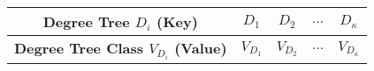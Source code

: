 \begin{tabular}{c || cccc}
	\textbf{Degree Tree \(D_i\) (Key)} & \(D_1\) & \(D_2\) & \(\dots\) & \(D_{\kappa}\) \\
	\hline
	\textbf{Degree Tree Class \(V_{D_i}\) (Value)} & \(V_{D_1}\) & \(V_{D_2}\) & \(\dots\) & \(V_{D_{\kappa}}\) \\
\end{tabular}

